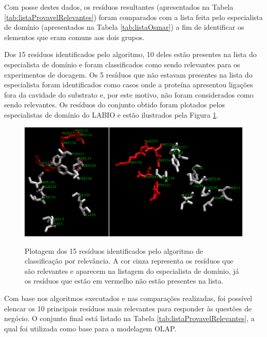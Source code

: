 Com posse destes dados, os resíduos resultantes (apresentados na Tabela \ref{tab:listaProvavelRelevantes}) foram comparados com a lista feita pelo especialista de domínio (apresentados na Tabela \ref{tab:listaOsmar}) a fim de identificar os elementos que eram comuns aos dois grupos. 

Dos 15 resíduos identificados pelo algoritmo, 10 deles estão presentes na lista do especialista de domínio e foram classificados como sendo relevantes para os experimentos de docagem. Os 5 resíduos que não estavam presentes na lista do especialista foram identificados como casos onde a proteína apresentou ligações fora da cavidade do substrato e, por este motivo, não foram considerados como sendo relevantes. Os resíduos do conjunto obtido foram plotados pelos especialistas de domínio do LABIO e estão ilustrados pela Figura \ref{fig:PlotResiduos}. 

\begin{figure}[h]
        \center
        \includegraphics[scale=0.55]{images/avaliacao_Residuos_nomes.png}
        \label{fig:PlotResiduos}
        \caption{Plotagem dos 15 resíduos identificados pelo algoritmo de classificação por relevância. A cor cinza representa os resíduos que são relevantes e aparecem na listagem do especialista de domínio, já os resíduos que estão em vermelho não estão presentes na lista.}
\end{figure}

Com base nos algoritmos executados e nas comparações realizadas, foi possível elencar os 10 principais resíduos mais relevantes para responder às questões de negócio. O conjunto final está listado na Tabela \ref{tab:listaProvavelRelevantes}, a qual foi utilizada como base para a modelagem OLAP.

